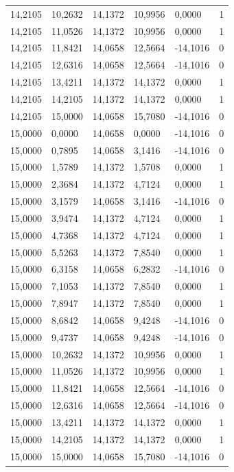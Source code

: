 \documentclass[12pt]{article}
\begin{document}
\begin{longtable}{@{}llllll@{}}
		14,2105 & 10,2632 & 14,1372 & 10,9956 & 0,0000   & 1  \\
		14,2105 & 11,0526 & 14,1372 & 10,9956 & 0,0000   & 1  \\
		14,2105 & 11,8421 & 14,0658 & 12,5664 & -14,1016 & 0  \\
		14,2105 & 12,6316 & 14,0658 & 12,5664 & -14,1016 & 0  \\
		14,2105 & 13,4211 & 14,1372 & 14,1372 & 0,0000   & 1  \\
		14,2105 & 14,2105 & 14,1372 & 14,1372 & 0,0000   & 1  \\
		14,2105 & 15,0000 & 14,0658 & 15,7080 & -14,1016 & 0  \\
		15,0000 & 0,0000  & 14,0658 & 0,0000  & -14,1016 & 0  \\
		15,0000 & 0,7895  & 14,0658 & 3,1416  & -14,1016 & 0  \\
		15,0000 & 1,5789  & 14,1372 & 1,5708  & 0,0000   & 1  \\
		15,0000 & 2,3684  & 14,1372 & 4,7124  & 0,0000   & 1  \\
		15,0000 & 3,1579  & 14,0658 & 3,1416  & -14,1016 & 0  \\
		15,0000 & 3,9474  & 14,1372 & 4,7124  & 0,0000   & 1  \\
		15,0000 & 4,7368  & 14,1372 & 4,7124  & 0,0000   & 1  \\
		15,0000 & 5,5263  & 14,1372 & 7,8540  & 0,0000   & 1  \\
		15,0000 & 6,3158  & 14,0658 & 6,2832  & -14,1016 & 0  \\
		15,0000 & 7,1053  & 14,1372 & 7,8540  & 0,0000   & 1  \\
		15,0000 & 7,8947  & 14,1372 & 7,8540  & 0,0000   & 1  \\
		15,0000 & 8,6842  & 14,0658 & 9,4248  & -14,1016 & 0  \\
		15,0000 & 9,4737  & 14,0658 & 9,4248  & -14,1016 & 0  \\
		15,0000 & 10,2632 & 14,1372 & 10,9956 & 0,0000   & 1  \\
		15,0000 & 11,0526 & 14,1372 & 10,9956 & 0,0000   & 1  \\
		15,0000 & 11,8421 & 14,0658 & 12,5664 & -14,1016 & 0  \\
		15,0000 & 12,6316 & 14,0658 & 12,5664 & -14,1016 & 0  \\
		15,0000 & 13,4211 & 14,1372 & 14,1372 & 0,0000   & 1  \\
		15,0000 & 14,2105 & 14,1372 & 14,1372 & 0,0000   & 1  \\
		15,0000 & 15,0000 & 14,0658 & 15,7080 & -14,1016 & 0  \\ \bottomrule
	\end{longtable}
	
\end{document}
